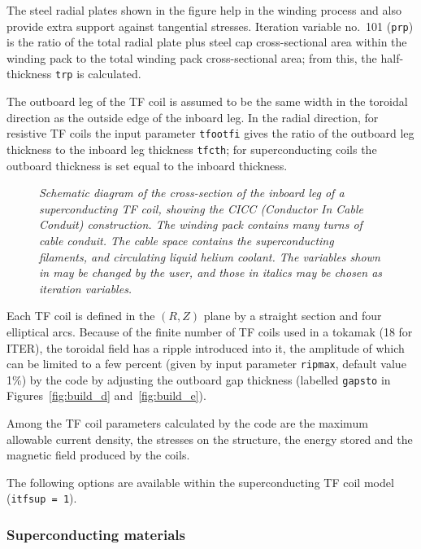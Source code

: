 \documentclass[11pt,a4paper]{report}
\begin{document}
The steel radial plates shown in the figure help in the winding process and
also provide extra support against tangential stresses. Iteration
variable no.\ 101 (\texttt{prp}) is the ratio of the total radial plate plus
steel cap cross-sectional area within the winding pack to the total winding
pack cross-sectional area; from this, the half-thickness \texttt{trp} is
calculated.

The outboard leg of the TF coil is assumed to be the same width in the
toroidal direction as the outside edge of the inboard leg. In the radial
direction, for resistive TF coils the input parameter \texttt{tfootfi} gives
the ratio of the outboard leg thickness to the inboard leg thickness
\texttt{tfcth}; for superconducting coils the outboard thickness is set equal
to the inboard thickness.

\begin{figure}[tbph]
\caption[Schematic diagram of the cross-section of a superconducting TF coil
inner leg]
{\label{fig:CICC}
  \textit{Schematic diagram of the cross-section of the inboard leg of a
    superconducting TF coil, showing the CICC (Conductor In Cable Conduit)
    construction. The winding pack contains many turns of cable conduit. The
    cable space contains the superconducting filaments, and circulating liquid
    helium coolant. The variables shown in  may be changed by the
    user, and those in italics may be chosen as iteration variables.}
}
\end{figure}

Each TF coil is defined in the $(R,Z)$ plane by a straight section and four elliptical arcs. Because of the finite
number of TF coils used in a tokamak (18 for ITER), the toroidal field
has a ripple introduced into it, the amplitude of which can be limited to a
few percent (given by input parameter \texttt{ripmax}, default value 1\%) by
the code by adjusting the outboard gap thickness (labelled \texttt{gapsto} in
Figures~\ref{fig:build_d} and~\ref{fig:build_e}).

Among the TF coil parameters calculated by the code are the maximum allowable
current density, the stresses on the structure, the energy stored and the
magnetic field produced by the coils.

The following options are available within the superconducting TF coil model
(\texttt{itfsup = 1}).

\subsubsection{Superconducting materials}
\label{sec:superconductors}
\end{document}

